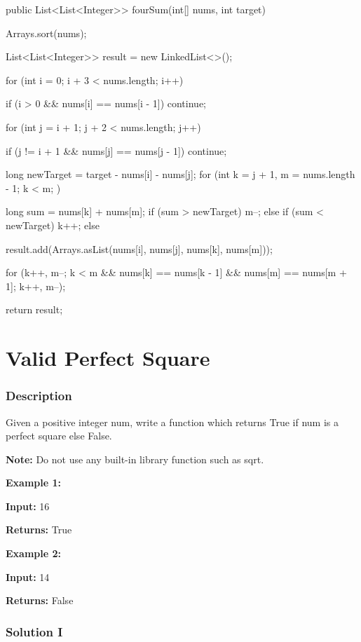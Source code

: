 \begin{Code}
public List<List<Integer>> fourSum(int[] nums, int target) {
    Arrays.sort(nums);

    List<List<Integer>> result = new LinkedList<>();

    for (int i = 0; i + 3 < nums.length; i++) {
        if (i > 0 && nums[i] == nums[i - 1]) {
            continue;
        }

        for (int j = i + 1; j + 2 < nums.length; j++) {
            if (j != i + 1 && nums[j] == nums[j - 1]) {
                continue;
            }

            long newTarget = target - nums[i] - nums[j];
            for (int k = j + 1, m = nums.length - 1; k < m; ) {
                long sum = nums[k] + nums[m];
                if (sum > newTarget) {
                    m--;
                } else if (sum < newTarget) {
                    k++;
                } else {
                    result.add(Arrays.asList(nums[i], nums[j], nums[k], nums[m]));

                    for (k++, m--; k < m && nums[k] == nums[k - 1] && nums[m] == nums[m + 1]; k++, m--);
                }
            }
        }
    }

    return result;
}
\end{Code}

\newpage

\section{Valid Perfect Square} %

\subsubsection{Description}
Given a positive integer num, write a function which returns True if num is a perfect square else False.

\textbf{Note:} Do not use any built-in library function such as sqrt.

\textbf{Example 1:}

\textbf{Input:} 16

\textbf{Returns:} True

\textbf{Example 2:}

\textbf{Input:} 14

\textbf{Returns:} False
\subsubsection{Solution I}

